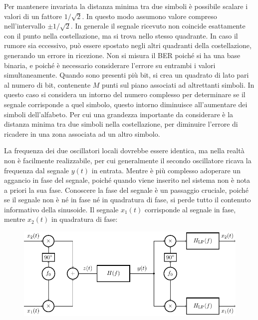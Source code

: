\documentclass{article}
\numberwithin{equation}{subsection}
\begin{document}
Per mantenere invariata la distanza minima tra due simboli è possibile scalare i valori di un fattore $1/\sqrt2$. In questo modo assumono 
valore compreso nell'intervallo $\pm1/\sqrt2$. In generale il segnale ricevuto non coincide esattamente con il punto nella costellazione, ma si trova 
nello stesso quadrante. In caso il rumore sia eccessivo, può essere spostato negli altri quadranti della costellazione, generando un errore in ricezione. 
Non si misura il BER poiché si ha una base binaria, e poiché è necessario considerare l'errore su entrambi i 
valori simultaneamente. 
Quando sono presenti più bit, si crea un quadrato di lato pari al numero di bit, contenente $M$ punti sul piano associati ad altrettanti simboli. In questo caso si considera un 
intorno del numero complesso per determinare se il segnale corrisponde a quel simbolo, questo intorno diminuisce all'aumentare dei simboli dell'alfabeto. Per cui 
una grandezza importante da considerare è la distanza minima tra due simboli nella costellazione, per diminuire l'errore di ricadere in una zona associata ad un 
altro simbolo.  

La frequenza dei due oscillatori locali dovrebbe essere identica, ma nella realtà non è facilmente realizzabile, per cui 
generalmente il secondo oscillatore ricava la frequenza dal segnale $y(t)$ in entrata. Mentre è più complesso adoperare un aggancio in fase del segnale, poiché 
quando viene inserito nel sistema non è nota a priori la sua fase. Conoscere la fase del segnale è un passaggio cruciale, poiché se il segnale non è né in fase né in 
quadratura di fase, si perde tutto il contenuto informativo della sinusoide. 
Il segnale $x_1(t)$ corrisponde al segnale in fase, mentre $x_2(t)$ in quadratura di fase:
\begin{figure}[H]%
    \centering
    \includegraphics{qam.pdf}
\end{figure}
\end{document}
